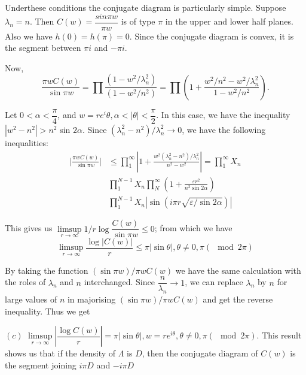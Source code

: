 Under\pageoriginale these conditions the conjugate diagram is particularly
simple. Suppose $\lambda_n = n$. Then $C(w) = \dfrac{sin \pi w}{\pi
 w}$ is of type $\pi$ in the upper and lower half planes. Also we
have $h(0) = h(\pi) = 0$. Since the conjugate diagram is convex, it is
the segment between $\pi i$ and $- \pi i$. 

Now,
$$
\frac{\pi w C(w)}{\sin \pi w} = \prod \frac{(1 - w^2 /
 \lambda^2_n)}{(1 - w^2 / n^2)} = \prod \left(1 + \frac{w^2/n^2 - w^2 /
 \lambda^2_n}{1 - w^2 / n^2}\right). 
$$

Let $0 < \alpha < \dfrac{\pi}{4}$, and $w = r e^i \theta, \alpha <
|\theta| < \dfrac{\pi}{2}$. In this case, we have the inequality $|w^2
- n^2| > n^2$ sin $2 \alpha$. Since $(\lambda^2_n - n^2) / \lambda^2_n
\rightarrow 0$, we have the following inequalities: 
\begin{align*}
 \bigg |\frac{\pi w C(w)}{\sin \pi w}\bigg | & \le \prod^\infty_1 \left| 1
 + \frac{w^2(\lambda^2_n - n^2) / \lambda^2_n}{n^2 - w^2}\right| =
 \prod^\infty_1 X_n \\ 
 & \prod^{N-1}_1 X_n \prod^\infty_N (1 + \frac {\varepsilon r^2}{n^2
 \sin 2 \alpha}) \\ 
 & \prod^{N-1}_1 X_n |\sin (i \pi r \sqrt{\varepsilon / \sin 2\alpha})|
\end{align*}

This gives us $ \limsup \limits_{r \rightarrow \infty} 1 / r \log
\dfrac {C(w)}{\sin \pi w} \le 0$; from which we have 
$$
\limsup \limits_{r \rightarrow \infty} \frac{\log|C(w)|}{r} \le \pi
|\sin \theta |, \theta \neq 0, \pi (\mod 2 \pi) 
$$ 

By taking the function $(\sin \pi w) / \pi w C(w)$ we have the same
calculation with the roles of $\lambda_n$ and $n$ interchanged. Since
$\dfrac{n}{\lambda_n} \rightarrow 1$, we can replace $\lambda_n$ by
$n$ for large values of $n$ in majorising $(\sin \pi w)/ \pi w C(w)$
and get the reverse inequality. Thus we get 

$(c)$ $\limsup \limits_{r \rightarrow \infty} | \dfrac{\log C(w)}{r}| =
\pi |\sin \theta |, w = r e^{i \theta}, \theta \neq 0, \pi (\mod 2
\pi)$. This result shows us that if the density of $\Lambda$ is $D$,
then the conjugate diagram of $C(w)$ is the segment joining $i \pi D$
and $-i \pi D$ 
\medskip
\pageoriginale

